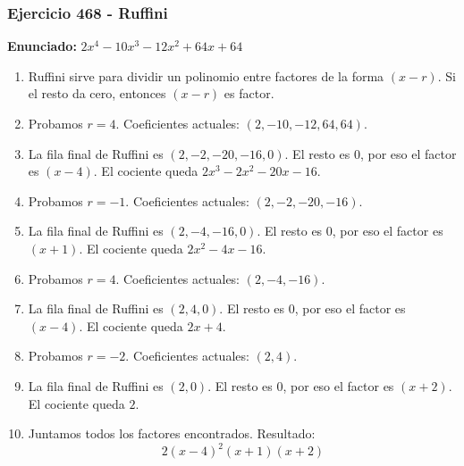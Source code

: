 \documentclass[11pt,a4paper]{article}
\begin{document}
\subsubsection*{Ejercicio 468 - Ruffini}
\textbf{Enunciado:} $ 2 x^{4} - 10 x^{3} - 12 x^{2} + 64 x + 64 $\par
\begin{enumerate}[leftmargin=2em]
\item Ruffini sirve para dividir un polinomio entre factores de la forma \((x-r)\). Si el resto da cero, entonces \((x-r)\) es factor.
\item Probamos \(r=4\). Coeficientes actuales: \((2, -10, -12, 64, 64)\).
\item La fila final de Ruffini es \((2, -2, -20, -16, 0)\). El resto es \(0\), por eso el factor es \((x-4)\). El cociente queda \(2 x^{3} - 2 x^{2} - 20 x - 16\).
\item Probamos \(r=-1\). Coeficientes actuales: \((2, -2, -20, -16)\).
\item La fila final de Ruffini es \((2, -4, -16, 0)\). El resto es \(0\), por eso el factor es \((x+1)\). El cociente queda \(2 x^{2} - 4 x - 16\).
\item Probamos \(r=4\). Coeficientes actuales: \((2, -4, -16)\).
\item La fila final de Ruffini es \((2, 4, 0)\). El resto es \(0\), por eso el factor es \((x-4)\). El cociente queda \(2 x + 4\).
\item Probamos \(r=-2\). Coeficientes actuales: \((2, 4)\).
\item La fila final de Ruffini es \((2, 0)\). El resto es \(0\), por eso el factor es \((x+2)\). El cociente queda \(2\).
\item Juntamos todos los factores encontrados. Resultado: \[\boxed{2 \left(x - 4\right)^{2} \left(x + 1\right) \left(x + 2\right)}\]
\end{enumerate}

\vspace{0.2cm}
\end{document}
